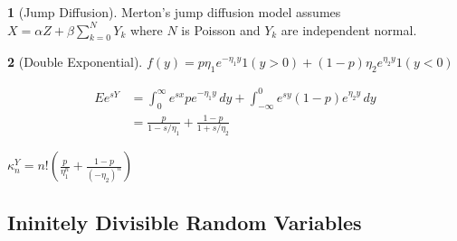 \documentclass[fleqn]{amsart}
\theoremstyle{definition}
\newtheorem*{example}{}
\begin{document}
\begin{example}[Jump Diffusion]
Merton's \cite{Mer?} jump diffusion model assumes
\(X = \alpha Z + \beta\sum_{k=0}^N Y_k\) where
\(N\) is Poisson and \(Y_k\) are independent normal.
\end{example}

\begin{example}[Double Exponential]
\(f(y) = p\eta_1 e^{-\eta_1 y}1(y > 0) + (1 - p)\eta_2 e^{\eta_2 y}1(y < 0)\)

\begin{align*}
Ee^{sY} &= \int_0^\infty e^{sx} pe^{-\eta_1 y}\,dy
+ \int_{-\infty}^0 e^{sy} (1-p)e^{\eta_2 y}\,dy\\
&= \frac{p}{1-s/\eta_1} + \frac{1-p}{1 + s/\eta_2}
\end{align*}

\(\kappa^Y_n = n!(\frac{p}{\eta_1^n} + \frac{1-p}{(-\eta_2)^n})\)
\end{example}


%



\subsection{Ininitely Divisible Random Variables}
\end{document}
